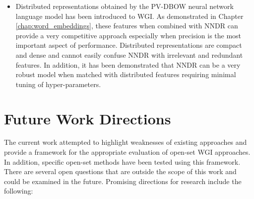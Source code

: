 \begin{itemize}
    \item Distributed representations obtained by the PV-DBOW neural network language model has been introduced to WGI. As demonstrated in Chapter \ref{chap:word_embeddings}, these features when combined with NNDR can provide a very competitive approach especially when precision is the most important aspect of performance. Distributed representations are compact and dense and cannot easily confuse NNDR with irrelevant and redundant features. In addition, it has been demonstrated that NNDR can be a very robust model when matched with distributed features requiring minimal tuning of hyper-parameters.
\end{itemize}

\section{Future Work Directions}

The current work attempted to highlight weaknesses of existing approaches and provide a framework for the appropriate evaluation of open-set WGI approaches. In addition, specific open-set methods have been tested using this framework. There are several open questions that are outside the scope of this work and could be examined in the future. Promising directions for research include the following:

